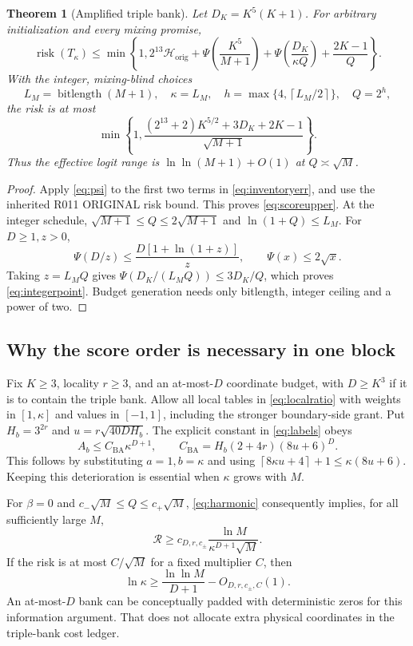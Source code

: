 \documentclass[11pt,letterpaper]{article}
\newtheorem{theorem}{Theorem}[section]
\theoremstyle{definition}\newtheorem{definition}[theorem]{Definition}
\theoremstyle{remark}\newtheorem{remark}[theorem]{Remark}
\newcommand{\ceil}[1]{\left\lceil #1\right\rceil}
\newcommand{\Risk}{\mathcal{R}}
\newcommand{\bl}{\operatorname{bitlength}}
\newcommand{\unit}[1]{\textsf{#1}}
\begin{document}
\begin{theorem}[Amplified triple bank]\label{thm:scoreupper}
Let $D_K=K^5(K+1)$. For arbitrary initialization and every mixing promise,
\begin{equation}\label{eq:scoreupper}
 \operatorname{risk}(T_\kappa)\le\min\left\{1,
 2^{13}\mathcal H_{\mathrm{orig}}+\Psi\left(\frac{K^5}{M+1}\right)
 +\Psi\left(\frac{D_K}{\kappa Q}\right)+\frac{2K-1}{Q}\right\}.
\end{equation}
With the integer, mixing-blind choices
\[
 L_M=\bl(M+1),\quad \kappa=L_M,\quad
 h=\max\{4,\ceil{L_M/2}\},\quad Q=2^h,
\]
the risk is at most
\begin{equation}\label{eq:integerpoint}
 \min\left\{1,\frac{(2^{13}+2)K^{5/2}+3D_K+2K-1}{\sqrt{M+1}}\right\}.
\end{equation}
Thus the effective logit range is $\ln\ln(M+1)+O(1)$ at $Q\asymp\sqrt M$.
\end{theorem}
\begin{proof}
Apply \eqref{eq:psi} to the first two terms in \eqref{eq:inventoryerr}, and use the inherited \unit{R011 ORIGINAL} risk bound. This proves \eqref{eq:scoreupper}. At the integer schedule, $\sqrt{M+1}\le Q\le2\sqrt{M+1}$ and $\ln(1+Q)\le L_M$. For $D\ge1,z>0$,
\[
 \Psi(D/z)\le\frac{D[1+\ln(1+z)]}{z},\qquad \Psi(x)\le2\sqrt x.
\]
Taking $z=L_MQ$ gives $\Psi(D_K/(L_MQ))\le3D_K/Q$, which proves \eqref{eq:integerpoint}. Budget generation needs only bitlength, integer ceiling and a power of two.
\end{proof}

\subsection{Why the score order is necessary in one block}
Fix $K\ge3$, locality $r\ge3$, and an at-most-$D$ coordinate budget, with $D\ge K^3$ if it is to contain the triple bank. Allow all local tables in \eqref{eq:localratio} with weights in $[1,\kappa]$ and values in $[-1,1]$, including the stronger boundary-side grant. Put $H_b=3^{2r}$ and $u=r\sqrt{40DH_b}$. The explicit constant in \eqref{eq:labels} obeys
\[
 A_b\le C_{\mathrm{BA}}\kappa^{D+1},\qquad
 C_{\mathrm{BA}}=H_b(2+4r)(8u+6)^D.
\]
This follows by substituting $a=1,b=\kappa$ and using $\ceil{8\kappa u+4}+1\le\kappa(8u+6)$. Keeping this deterioration is essential when $\kappa$ grows with $M$.

For $\beta=0$ and $c_-\sqrt M\le Q\le c_+\sqrt M$, \eqref{eq:harmonic} consequently implies, for all sufficiently large $M$,
\begin{equation}\label{eq:scorelower}
 \Risk\ge c_{D,r,c_\pm}\frac{\ln M}{\kappa^{D+1}\sqrt M}.
\end{equation}
If the risk is at most $C/\sqrt M$ for a fixed multiplier $C$, then
\begin{equation}\label{eq:rangenecessary}
 \ln\kappa\ge\frac{\ln\ln M}{D+1}-O_{D,r,c_\pm,C}(1).
\end{equation}
An at-most-$D$ bank can be conceptually padded with deterministic zeros for this information argument. That does not allocate extra physical coordinates in the triple-bank cost ledger.
\end{document}
